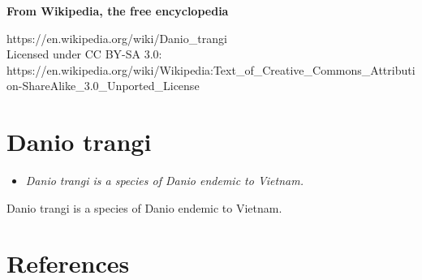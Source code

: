\textbf{From Wikipedia, the free encyclopedia}

https://en.wikipedia.org/wiki/Danio\_trangi\\
Licensed under CC BY-SA 3.0:\\
https://en.wikipedia.org/wiki/Wikipedia:Text\_of\_Creative\_Commons\_Attribution-ShareAlike\_3.0\_Unported\_License

\section{Danio trangi}\label{danio-trangi}

\begin{itemize}
\item
  \emph{Danio trangi is a species of Danio endemic to Vietnam.}
\end{itemize}

Danio trangi is a species of Danio endemic to Vietnam.

\section{References}\label{references}
